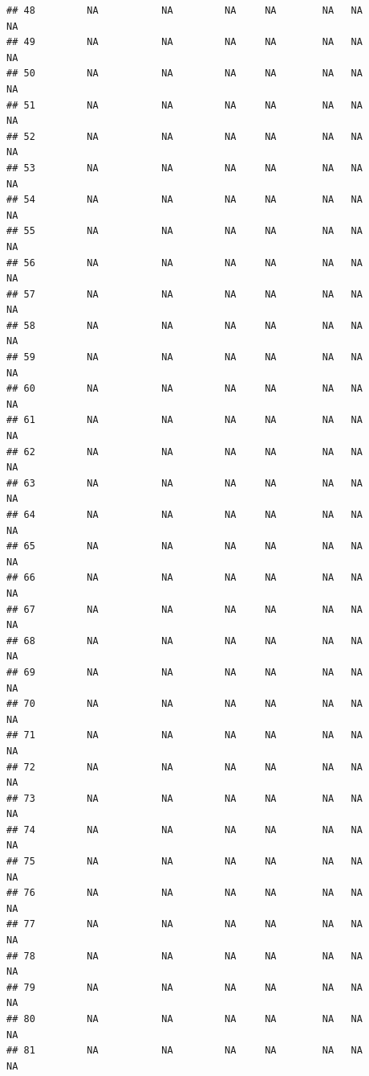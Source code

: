 \documentclass[
]{article}
\begin{document}
\begin{verbatim}
## 48         NA           NA         NA     NA        NA   NA             NA
## 49         NA           NA         NA     NA        NA   NA             NA
## 50         NA           NA         NA     NA        NA   NA             NA
## 51         NA           NA         NA     NA        NA   NA             NA
## 52         NA           NA         NA     NA        NA   NA             NA
## 53         NA           NA         NA     NA        NA   NA             NA
## 54         NA           NA         NA     NA        NA   NA             NA
## 55         NA           NA         NA     NA        NA   NA             NA
## 56         NA           NA         NA     NA        NA   NA             NA
## 57         NA           NA         NA     NA        NA   NA             NA
## 58         NA           NA         NA     NA        NA   NA             NA
## 59         NA           NA         NA     NA        NA   NA             NA
## 60         NA           NA         NA     NA        NA   NA             NA
## 61         NA           NA         NA     NA        NA   NA             NA
## 62         NA           NA         NA     NA        NA   NA             NA
## 63         NA           NA         NA     NA        NA   NA             NA
## 64         NA           NA         NA     NA        NA   NA             NA
## 65         NA           NA         NA     NA        NA   NA             NA
## 66         NA           NA         NA     NA        NA   NA             NA
## 67         NA           NA         NA     NA        NA   NA             NA
## 68         NA           NA         NA     NA        NA   NA             NA
## 69         NA           NA         NA     NA        NA   NA             NA
## 70         NA           NA         NA     NA        NA   NA             NA
## 71         NA           NA         NA     NA        NA   NA             NA
## 72         NA           NA         NA     NA        NA   NA             NA
## 73         NA           NA         NA     NA        NA   NA             NA
## 74         NA           NA         NA     NA        NA   NA             NA
## 75         NA           NA         NA     NA        NA   NA             NA
## 76         NA           NA         NA     NA        NA   NA             NA
## 77         NA           NA         NA     NA        NA   NA             NA
## 78         NA           NA         NA     NA        NA   NA             NA
## 79         NA           NA         NA     NA        NA   NA             NA
## 80         NA           NA         NA     NA        NA   NA             NA
## 81         NA           NA         NA     NA        NA   NA             NA

\end{verbatim}
\end{document}
